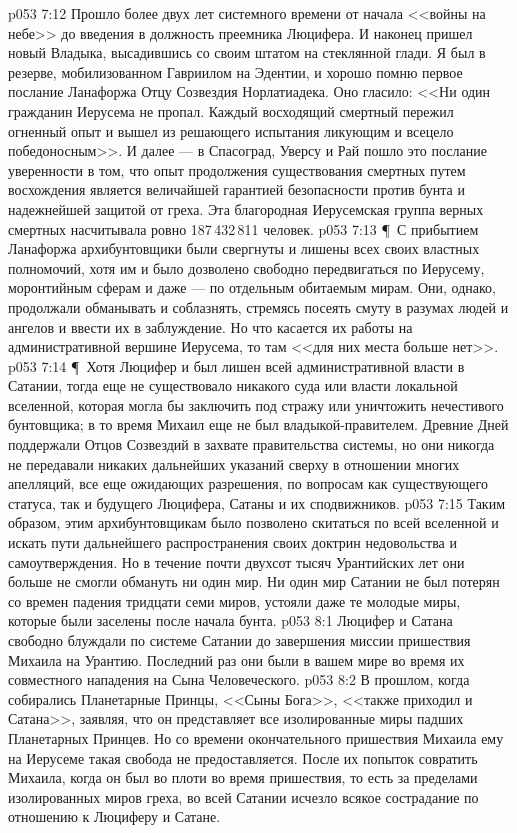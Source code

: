 \vs p053 7:12 Прошло более двух лет системного времени от начала <<войны на небе>> до введения в должность преемника Люцифера. И наконец пришел новый Владыка, высадившись со своим штатом на стеклянной глади. Я был в резерве, мобилизованном Гавриилом на Эдентии, и хорошо помню первое послание Ланафоржа Отцу Созвездия Норлатиадека. Оно гласило: <<Ни один гражданин Иерусема не пропал. Каждый восходящий смертный пережил огненный опыт и вышел из решающего испытания ликующим и всецело победоносным>>. И далее --- в Спасоград, Уверсу и Рай пошло это послание уверенности в том, что опыт продолжения существования смертных путем восхождения является величайшей гарантией безопасности против бунта и надежнейшей защитой от греха. Эта благородная Иерусемская группа верных смертных насчитывала ровно 187\,432\,811 человек.
\vs p053 7:13 \P\ С прибытием Ланафоржа архибунтовщики были свергнуты и лишены всех своих властных полномочий, хотя им и было дозволено свободно передвигаться по Иерусему, моронтийным сферам и даже --- по отдельным обитаемым мирам. Они, однако, продолжали обманывать и соблазнять, стремясь посеять смуту в разумах людей и ангелов и ввести их в заблуждение. Но что касается их работы на административной вершине Иерусема, то там <<для них места больше нет>>.
\vs p053 7:14 \P\ Хотя Люцифер и был лишен всей административной власти в Сатании, тогда еще не существовало никакого суда или власти локальной вселенной, которая могла бы заключить под стражу или уничтожить нечестивого бунтовщика; в то время Михаил еще не был владыкой\hyp{}правителем. Древние Дней поддержали Отцов Созвездий в захвате правительства системы, но они никогда не передавали никаких дальнейших указаний сверху в отношении многих апелляций, все еще ожидающих разрешения, по вопросам как существующего статуса, так и будущего Люцифера, Сатаны и их сподвижников.
\vs p053 7:15 Таким образом, этим архибунтовщикам было позволено скитаться по всей вселенной и искать пути дальнейшего распространения своих доктрин недовольства и самоутверждения. Но в течение почти двухсот тысяч Урантийских лет они больше не смогли обмануть ни один мир. Ни один мир Сатании не был потерян со времен падения тридцати семи миров, устояли даже те молодые миры, которые были заселены после начала бунта.
\vs p053 8:1 Люцифер и Сатана свободно блуждали по системе Сатании до завершения миссии пришествия Михаила на Урантию. Последний раз они были в вашем мире во время их совместного нападения на Сына Человеческого.
\vs p053 8:2 В прошлом, когда собирались Планетарные Принцы, <<Сыны Бога>>, <<также приходил и Сатана>>, заявляя, что он представляет все изолированные миры падших Планетарных Принцев. Но со времени окончательного пришествия Михаила ему на Иерусеме такая свобода не предоставляется. После их попыток совратить Михаила, когда он был во плоти во время пришествия, то есть за пределами изолированных миров греха, во всей Сатании исчезло всякое сострадание по отношению к Люциферу и Сатане.
